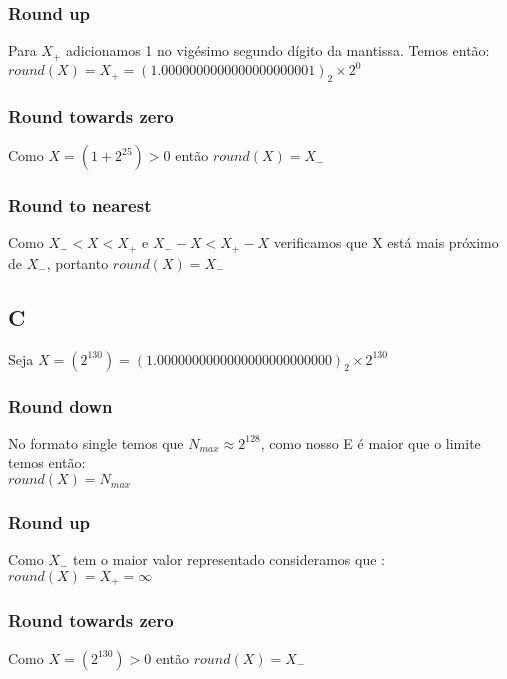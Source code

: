       \subsubsection*{Round up}
        Para $X_{+} $ adicionamos 1 no vigésimo segundo dígito da mantissa. Temos então: \\

        $round(X) = X_{+} = (1.000 000 000 000 000 000 000 1)_{2} \times 2^{0}$

      \subsubsection*{Round towards zero}
        Como $X = (1 + 2^{25}) > 0$ então $round(X) = X_{-}$

      \subsubsection*{Round to nearest}
        Como $X_{-} < X < X_{+}$ e $X_{-} - X < X_{+} - X $ verificamos que X está mais próximo de $X_{-}$, portanto $round(X) = X_{-}$

    \subsection{C}
      Seja $ X = (2^{130}) = (1.000 000 000 000 000 000 000 000 0)_2 \times 2^{130}$

      \subsubsection*{Round down}
        No formato single temos que $N_{max} \approx 2^{128}$, como nosso E é maior que o limite temos então: \\

        $round(X) = N_{max}$
      \subsubsection*{Round up}
        Como $X_{-}$ tem o maior valor representado consideramos que : \\

        $round(X) = X_{+} = \infty$

      \subsubsection*{Round towards zero}
        Como $X = (2^{130}) > 0$ então $round(X) = X_{-}$

